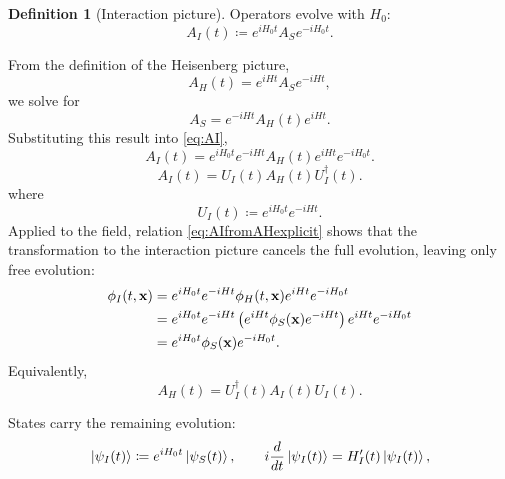 \documentclass[11pt,letterpaper]{article}
\theoremstyle{definition}
\newtheorem{definicion}{Definition}
\theoremstyle{definition}
\newcommand{\eqbox}[1]{\boxed{\displaystyle #1}}
\begin{document}
\begin{definicion}[Interaction picture]
Operators evolve with $H_0$:
\begin{equation}
  \eqbox{A_I(t)
  \coloneqq e^{iH_0t}A_Se^{-iH_0t}.}
  \label{eq:AI}
\end{equation}

From the definition of the Heisenberg picture,
\begin{equation}
  A_H(t)=e^{iHt}A_Se^{-iHt},
\end{equation}
we solve for
\begin{equation}
  A_S=e^{-iHt}A_H(t)e^{iHt}.
\end{equation}
Substituting this result into \eqref{eq:AI},
\begin{equation}
  \eqbox{A_I(t)
  =e^{iH_0t}e^{-iHt}A_H(t)e^{iHt}e^{-iH_0t}.}
  \label{eq:AIfromAHexplicit}
\end{equation}
\begin{equation}
  \eqbox{A_I(t)=U_I(t)A_H(t)U_I^\dagger(t).}
  \label{eq:AIfromAH}
\end{equation}
where
\begin{equation}
  \eqbox{U_I(t)\coloneqq e^{iH_0t}e^{-iHt}.}
  \label{eq:UI}
\end{equation}
Applied to the field, relation \eqref{eq:AIfromAHexplicit} shows that the
transformation to the interaction picture cancels the full evolution,
leaving only free evolution:
\begin{align}
  \phi_I(t,\mathbf{x})
  &=e^{iH_0t}e^{-iHt}\phi_H(t,\mathbf{x})e^{iHt}e^{-iH_0t}
  \notag\\
  &=e^{iH_0t}e^{-iHt}
    \left(e^{iHt}\phi_S(\mathbf{x})e^{-iHt}\right)
    e^{iHt}e^{-iH_0t}
  \notag\\
  &=e^{iH_0t}\phi_S(\mathbf{x})e^{-iH_0t}.
  \label{eq:phiIfromphiH}
\end{align}
Equivalently,
\begin{equation}
  \eqbox{A_H(t)=U_I^\dagger(t)A_I(t)U_I(t).}
\end{equation}

States carry the remaining evolution:
\begin{equation}
  \ket{\psi_I(t)}\coloneqq e^{iH_0t}\ket{\psi_S(t)},
  \qquad
  i\frac{d}{dt}\ket{\psi_I(t)}=H'_I(t)\ket{\psi_I(t)},
\end{equation}
\end{definicion}
\end{document}
